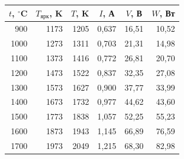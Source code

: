 \begin{enumerate}
		\begin{table}[h!]
			\centering
				\begin{tabular}{|r|r|r|r|r|r|}
					\hline
					\multicolumn{1}{|c|}{$t$, $^\circ$C} & \multicolumn{1}{c|}{$T_\text{ярк}$, K} & \multicolumn{1}{c|}{$T$, K} & \multicolumn{1}{c|}{$I$, А} & \multicolumn{1}{c|}{$V$, В} & \multicolumn{1}{c|}{$W$, Вт} \\ \hline
					900                                  & 1173                                   & 1205                        & 0,637                       & 16,51                       & 10,52                        \\ \hline
					1000                                 & 1273                                   & 1311                        & 0,703                       & 21,31                       & 14,98                        \\ \hline
					1100                                 & 1373                                   & 1416                        & 0,772                       & 26,81                       & 20,70                        \\ \hline
					1200                                 & 1473                                   & 1522                        & 0,837                       & 32,35                       & 27,08                        \\ \hline
					1300                                 & 1573                                   & 1627                        & 0,900                       & 37,77                       & 33,99                        \\ \hline
					1400                                 & 1673                                   & 1732                        & 0,977                       & 44,62                       & 43,60                        \\ \hline
					1500                                 & 1773                                   & 1838                       & 1,057                       & 52,25                       & 55,23                        \\ \hline
					1600                                 & 1873                                   & 1943                        & 1,145                       & 66,89                       & 76,59                        \\ \hline
					1700                                 & 1973                                   & 2049                        & 1,215                       & 68,30                       & 82,98                        \\ \hline

\end{tabular}
\end{table}
\end{enumerate}
